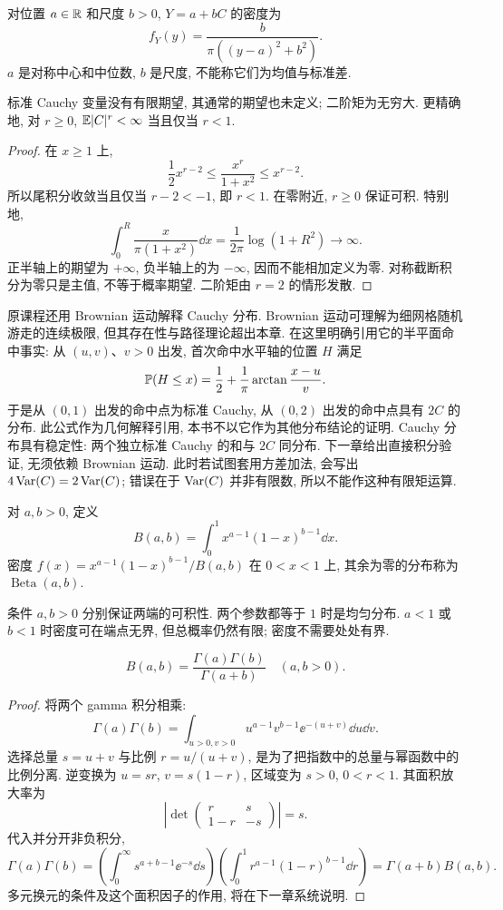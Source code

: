 对位置 $a\in\mathbb R$ 和尺度 $b>0$, $Y=a+bC$ 的密度为
\[
 f_Y(y)=\frac{b}{\pi((y-a)^2+b^2)}.
\]
$a$ 是对称中心和中位数, $b$ 是尺度, 不能称它们为均值与标准差.

\begin{proposition}
标准 Cauchy 变量没有有限期望, 其通常的期望也未定义; 二阶矩为无穷大. 更精确地, 对 $r\ge0$, $\mathbb E|C|^r<\infty$ 当且仅当 $r<1$.
\end{proposition}
\begin{proof}
在 $x\ge1$ 上,
\[
 \frac12x^{r-2}\le\frac{x^r}{1+x^2}\le x^{r-2}.
\]
所以尾积分收敛当且仅当 $r-2<-1$, 即 $r<1$. 在零附近, $r\ge0$ 保证可积. 特别地,
\[
 \int_0^R\frac{x}{\pi(1+x^2)}\dd x
 =\frac1{2\pi}\log(1+R^2)\longrightarrow\infty.
\]
正半轴上的期望为 $+\infty$, 负半轴上的为 $-\infty$, 因而不能相加定义为零. 对称截断积分为零只是主值, 不等于概率期望. 二阶矩由 $r=2$ 的情形发散.
\end{proof}

原课程还用 Brownian 运动解释 Cauchy 分布. Brownian 运动可理解为细网格随机游走的连续极限, 但其存在性与路径理论超出本章. 在这里明确引用它的半平面命中事实: 从 $(u,v)$、$v>0$ 出发, 首次命中水平轴的位置 $H$ 满足
\[
 \mathbb P(H\le x)=\frac12+\frac1\pi\arctan\frac{x-u}{v}.
\]
于是从 $(0,1)$ 出发的命中点为标准 Cauchy, 从 $(0,2)$ 出发的命中点具有 $2C$ 的分布. 此公式作为几何解释引用, 本书不以它作为其他分布结论的证明. Cauchy 分布具有稳定性: 两个独立标准 Cauchy 的和与 $2C$ 同分布. 下一章给出直接积分验证, 无须依赖 Brownian 运动. 此时若试图套用方差加法, 会写出 $4\operatorname{Var}(C)=2\operatorname{Var}(C)$; 错误在于 $\operatorname{Var}(C)$ 并非有限数, 所以不能作这种有限矩运算.


\begin{definition}
对 $a,b>0$, 定义
\[
 B(a,b)=\int_0^1 x^{a-1}(1-x)^{b-1}\dd x.
\]
密度 $f(x)=x^{a-1}(1-x)^{b-1}/B(a,b)$ 在 $0<x<1$ 上, 其余为零的分布称为 $\operatorname{Beta}(a,b)$.
\end{definition}

条件 $a,b>0$ 分别保证两端的可积性. 两个参数都等于 $1$ 时是均匀分布. $a<1$ 或 $b<1$ 时密度可在端点无界, 但总概率仍然有限; 密度不需要处处有界.

\begin{proposition}
\[
 B(a,b)=\frac{\Gamma(a)\Gamma(b)}{\Gamma(a+b)}\quad(a,b>0).
\]
\end{proposition}
\begin{proof}
将两个 gamma 积分相乘:
\[
 \Gamma(a)\Gamma(b)=\int_{u>0,v>0}
      u^{a-1}v^{b-1}\ee^{-(u+v)}\dd u\dd v.
\]
选择总量 $s=u+v$ 与比例 $r=u/(u+v)$, 是为了把指数中的总量与幂函数中的比例分离. 逆变换为 $u=sr$, $v=s(1-r)$, 区域变为 $s>0$, $0<r<1$. 其面积放大率为
\[
 \left|\det\begin{pmatrix}r&s\\1-r&-s\end{pmatrix}\right|=s.
\]
代入并分开非负积分,
\[
 \Gamma(a)\Gamma(b)
 =\left(\int_0^\infty s^{a+b-1}\ee^{-s}\dd s\right)
  \left(\int_0^1r^{a-1}(1-r)^{b-1}\dd r\right)
 =\Gamma(a+b)B(a,b).
\]
多元换元的条件及这个面积因子的作用, 将在下一章系统说明.
\end{proof}

